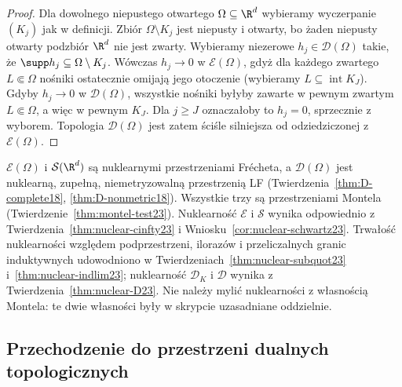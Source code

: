 \begin{proof}
Dla dowolnego niepustego otwartego $\Omega\subseteq\R^d$
wybieramy wyczerpanie $(K_j)$ jak w definicji.
Zbiór $\Omega\setminus K_j$ jest niepusty i otwarty,
bo żaden niepusty otwarty podzbiór $\R^d$ nie jest zwarty.
Wybieramy niezerowe $h_j\in\mathcal D(\Omega)$ takie,
że $\supp h_j\subseteq\Omega\setminus K_j$.
Wówczas $h_j\to0$ w $\mathcal E(\Omega)$, gdyż dla
każdego zwartego $L\Subset\Omega$ nośniki ostatecznie
omijają jego otoczenie (wybieramy $L\subseteq\operatorname{int}K_J$).
Gdyby $h_j\to0$ w $\mathcal D(\Omega)$, wszystkie nośniki
byłyby zawarte w pewnym zwartym $L\Subset\Omega$,
a więc w pewnym $K_J$. Dla $j\ge J$ oznaczałoby to
$h_j=0$, sprzecznie z wyborem. Topologia $\mathcal D(\Omega)$
jest zatem ściśle silniejsza od odziedziczonej z $\mathcal E(\Omega)$.
\end{proof}

\begin{uwaga}
\label{rem:tabela-struktur25}
$\mathcal E(\Omega)$ i $\mathcal S(\R^d)$ są nuklearnymi
przestrzeniami Frécheta, a $\mathcal D(\Omega)$ jest nuklearną,
zupełną, niemetryzowalną przestrzenią LF
(Twierdzenia~\ref{thm:D-complete18}, \ref{thm:D-nonmetric18}).
Wszystkie trzy są przestrzeniami Montela
(Twierdzenie~\ref{thm:montel-test23}).
Nuklearność $\mathcal E$ i $\mathcal S$ wynika odpowiednio
z Twierdzenia~\ref{thm:nuclear-cinfty23}
i Wniosku~\ref{cor:nuclear-schwartz23}.
Trwałość nuklearności względem podprzestrzeni, ilorazów
i przeliczalnych granic induktywnych udowodniono w
Twierdzeniach~\ref{thm:nuclear-subquot23} i~\ref{thm:nuclear-indlim23};
nuklearność $\mathcal D_K$ i $\mathcal D$ wynika z
Twierdzenia~\ref{thm:nuclear-D23}. Nie należy mylić nuklearności
z własnością Montela: te dwie własności były w skrypcie
uzasadniane oddzielnie.
\end{uwaga}

\subsection{Przechodzenie do przestrzeni dualnych topologicznych}

